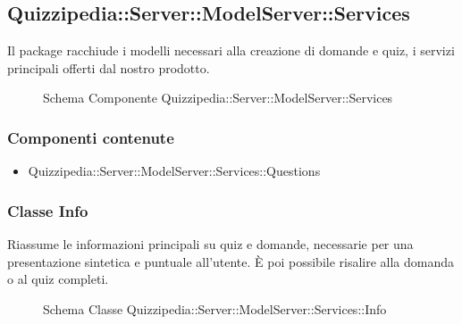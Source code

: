 \subsection{Quizzipedia::Server::ModelServer::Services}
Il package racchiude i modelli necessari alla creazione di domande e quiz, i servizi principali offerti dal nostro prodotto.
\begin{figure}[H]
\centering
\noindent{}
\caption[Schema Componente Quizzipedia::Server::ModelServer::Services]{Schema Componente Quizzipedia::Server::ModelServer::Services}
\end{figure}
\subsubsection{Componenti contenute}
\begin{itemize}
\item Quizzipedia::Server::ModelServer::Services::Questions
\end{itemize}
\subsubsection{Classe Info}
Riassume le informazioni principali su quiz e domande, necessarie per una presentazione sintetica e puntuale all'utente. È poi possibile risalire alla domanda o al quiz completi.
\begin{figure}[H]
\centering
\noindent{}
\caption[Schema Classe Info]{Schema Classe Quizzipedia::Server::ModelServer::Services::Info}
\end{figure}
